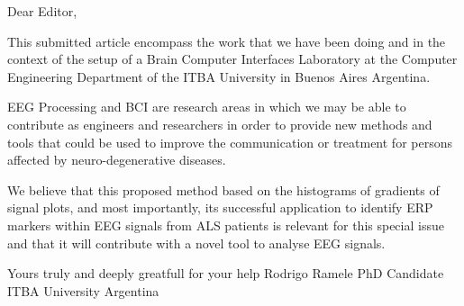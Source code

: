 Dear Editor, 

This submitted article encompass the work that we have been doing and in the context of the setup of a Brain Computer Interfaces Laboratory at the Computer Engineering Department of the ITBA University in Buenos Aires Argentina.

EEG Processing and BCI are research areas in which we may be able to contribute as engineers and researchers in order to provide new methods and tools that could be used to improve the communication or treatment for persons affected by neuro-degenerative diseases.

We believe that this proposed method based on the histograms of gradients of signal plots, and most importantly, its successful application to identify ERP markers within EEG signals from ALS patients is relevant for this special issue and that it will contribute with a novel tool to analyse EEG signals.

Yours truly and deeply greatfull for your help
Rodrigo Ramele
PhD Candidate
ITBA University 
Argentina